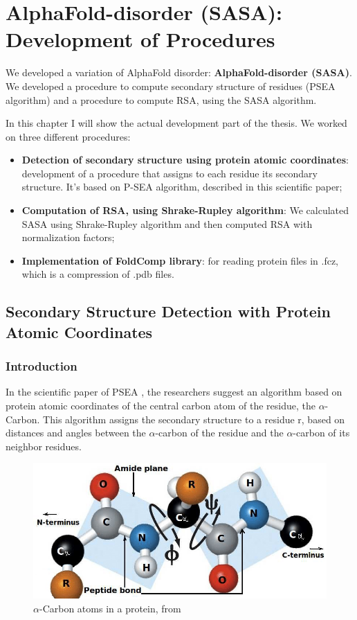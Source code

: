 \chapter{AlphaFold-disorder (SASA): Development of Procedures}
\label{chp:development}
We developed a variation of AlphaFold disorder: \textbf{AlphaFold-disorder (SASA)}. We developed a procedure to compute secondary structure of residues (PSEA algorithm) and a procedure to compute RSA, using the SASA algorithm.

In this chapter I will show the actual development part of the thesis. We worked on three different procedures:
\begin{itemize}
    \item \textbf{Detection of secondary structure using protein atomic coordinates}: development of a procedure that assigns to each residue its secondary structure. It's based on P-SEA algorithm, described in this scientific paper\cite{psea};
    \item \textbf{Computation of RSA, using Shrake-Rupley algorithm}: We calculated SASA using Shrake-Rupley algorithm and then computed RSA with normalization factors;
    \item \textbf{Implementation of FoldComp library}: for reading protein files in .fcz, which is a compression of .pdb files.
\end{itemize}

\section{Secondary Structure Detection with Protein Atomic Coordinates}
\subsection{Introduction}
In the scientific paper of PSEA \cite{psea}, the researchers suggest an algorithm based on protein atomic coordinates of the central carbon atom of the residue, the $\alpha$-Carbon. This algorithm assigns the secondary structure to a residue r, based on distances and angles between the $\alpha$-carbon of the residue and the $\alpha$-carbon of its neighbor residues.

\begin{figure}[h!]
    \centering
    \includegraphics[scale=0.6]{res/dev/alphacarbon.png}
    \caption{$\alpha$-Carbon atoms in a protein, from \cite{acarbons}}
    \label{fig:acarbons}
\end{figure}

